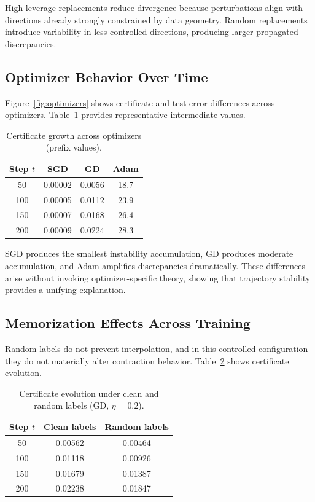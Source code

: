 \documentclass{article}
\numberwithin{equation}{section}
\begin{document}
High-leverage replacements reduce divergence because perturbations align with directions already strongly constrained by data geometry. Random replacements introduce variability in less controlled directions, producing larger propagated discrepancies.

\subsection{Optimizer Behavior Over Time}

Figure~\ref{fig:optimizers} shows certificate and test error differences across optimizers. Table~\ref{tab:optimizer_time} provides representative intermediate values.

\begin{table}[h]
	\centering
	\caption{Certificate growth across optimizers (prefix values).}
	\label{tab:optimizer_time}
	\begin{tabular}{c|c|c|c}
		\hline
		Step $t$ & SGD & GD & Adam \\
		\hline
		50  & 0.00002 & 0.0056 & 18.7 \\
		100 & 0.00005 & 0.0112 & 23.9 \\
		150 & 0.00007 & 0.0168 & 26.4 \\
		200 & 0.00009 & 0.0224 & 28.3 \\
		\hline
	\end{tabular}
\end{table}

SGD produces the smallest instability accumulation, GD produces moderate accumulation, and Adam amplifies discrepancies dramatically. These differences arise without invoking optimizer-specific theory, showing that trajectory stability provides a unifying explanation.

\subsection{Memorization Effects Across Training}

Random labels do not prevent interpolation, and in this controlled configuration they do not materially alter contraction behavior. Table~\ref{tab:random_labels_time} shows certificate evolution.

\begin{table}[h]
	\centering
	\caption{Certificate evolution under clean and random labels (GD, $\eta=0.2$).}
	\label{tab:random_labels_time}
	\begin{tabular}{c|c|c}
		\hline
		Step $t$ & Clean labels & Random labels \\
		\hline
		50  & 0.00562 & 0.00464 \\
		100 & 0.01118 & 0.00926 \\
		150 & 0.01679 & 0.01387 \\
		200 & 0.02238 & 0.01847 \\
		\hline
	\end{tabular}
\end{table}
\end{document}
